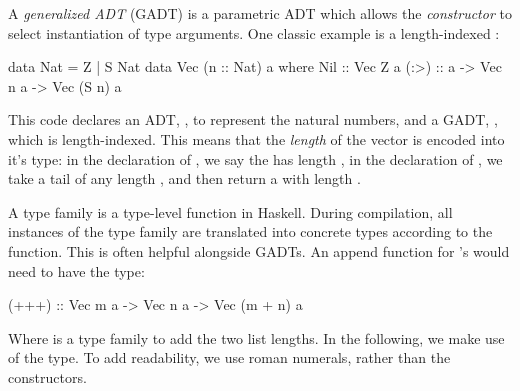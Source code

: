 
A \textit{generalized ADT} (GADT)
is a parametric ADT which allows the \textit{constructor}
to select instantiation of type arguments.
One classic example is a length-indexed :
\begin{smallhskcode}
data Nat = Z | S Nat        data Vec (n :: Nat) a where
                                Nil :: Vec Z a
                                (:>) :: a -> Vec n a -> Vec (S n) a
\end{smallhskcode}
This code declares an ADT, , to represent the natural numbers,
and a GADT, , which is length-indexed.
This means that the \textit{length} of the vector is encoded into it's type:
in the declaration of , we say the  has length ,
in the declaration of \hskin{:>}, we take a tail of any length ,
and then return a  with length .

A type family is a type-level function in Haskell.
During compilation, all instances of the type family are translated into concrete types according to the function.
This is often helpful alongside GADTs.
An append function for 's would need to have the type:
\begin{smallhskcode}
    (+++) :: Vec m a -> Vec n a -> Vec (m + n) a
\end{smallhskcode}
Where \hskin{+} is a type family to add the two list lengths.
In the following, we make use of the  type.
To add readability, we use roman numerals,
rather than the  constructors.
